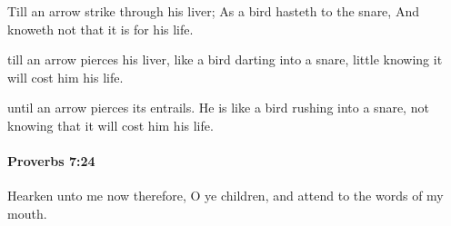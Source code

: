 			\begin{versebox}
					\item[BHS] 
					\item[ASV] Till an arrow strike through his liver; As a bird hasteth to the snare, And knoweth not that it is for his life.
					\item[NIV] till an arrow pierces his liver, like a bird darting into a snare, little knowing it will cost him his life.
					\item[NRSV] until an arrow pierces its entrails. He is like a bird rushing into a snare, not knowing that it will cost him his life.
			\end{versebox}

		\paragraph{Proverbs 7:24} %
			\label{PROVERBS-7-24}

			Hearken unto me now therefore, O ye children, and attend to the words of my mouth.

